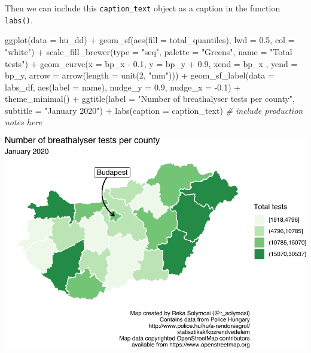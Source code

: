 \documentclass[
]{book}
\newenvironment{Shaded}{\begin{snugshade}}{\end{snugshade}}
\newcommand{\AttributeTok}[1]{\textcolor[rgb]{0.77,0.63,0.00}{#1}}
\newcommand{\CommentTok}[1]{\textcolor[rgb]{0.56,0.35,0.01}{\textit{#1}}}
\newcommand{\DecValTok}[1]{\textcolor[rgb]{0.00,0.00,0.81}{#1}}
\newcommand{\FloatTok}[1]{\textcolor[rgb]{0.00,0.00,0.81}{#1}}
\newcommand{\FunctionTok}[1]{\textcolor[rgb]{0.00,0.00,0.00}{#1}}
\newcommand{\NormalTok}[1]{#1}
\newcommand{\SpecialCharTok}[1]{\textcolor[rgb]{0.00,0.00,0.00}{#1}}
\newcommand{\StringTok}[1]{\textcolor[rgb]{0.31,0.60,0.02}{#1}}
\begin{document}
Then we can include this \texttt{caption\_text} object as a caption in the function \texttt{labs()}.

\begin{Shaded}
\begin{Highlighting}[]
\FunctionTok{ggplot}\NormalTok{(}\AttributeTok{data =}\NormalTok{ hu\_dd) }\SpecialCharTok{+} 
  \FunctionTok{geom\_sf}\NormalTok{(}\FunctionTok{aes}\NormalTok{(}\AttributeTok{fill =}\NormalTok{ total\_quantiles), }
          \AttributeTok{lwd =} \FloatTok{0.5}\NormalTok{, }\AttributeTok{col =} \StringTok{"white"}\NormalTok{) }\SpecialCharTok{+} 
  \FunctionTok{scale\_fill\_brewer}\NormalTok{(}\AttributeTok{type =} \StringTok{"seq"}\NormalTok{, }
                    \AttributeTok{palette =} \StringTok{"Greens"}\NormalTok{, }
                    \AttributeTok{name =} \StringTok{"Total tests"}\NormalTok{) }\SpecialCharTok{+} 
  \FunctionTok{geom\_curve}\NormalTok{(}\AttributeTok{x =}\NormalTok{ bp\_x }\SpecialCharTok{{-}} \FloatTok{0.1}\NormalTok{, }
             \AttributeTok{y =}\NormalTok{ bp\_y }\SpecialCharTok{+} \FloatTok{0.9}\NormalTok{, }
             \AttributeTok{xend =}\NormalTok{ bp\_x , }
             \AttributeTok{yend =}\NormalTok{ bp\_y, }
             \AttributeTok{arrow =} \FunctionTok{arrow}\NormalTok{(}\AttributeTok{length =} \FunctionTok{unit}\NormalTok{(}\DecValTok{2}\NormalTok{, }\StringTok{"mm"}\NormalTok{))) }\SpecialCharTok{+}
  \FunctionTok{geom\_sf\_label}\NormalTok{(}\AttributeTok{data =}\NormalTok{ labs\_df, }
                \FunctionTok{aes}\NormalTok{(}\AttributeTok{label =}\NormalTok{ name), }
                \AttributeTok{nudge\_y =} \FloatTok{0.9}\NormalTok{, }
                \AttributeTok{nudge\_x =} \SpecialCharTok{{-}}\FloatTok{0.1}\NormalTok{) }\SpecialCharTok{+} 
  \FunctionTok{theme\_minimal}\NormalTok{() }\SpecialCharTok{+} 
  \FunctionTok{ggtitle}\NormalTok{(}\AttributeTok{label =} \StringTok{"Number of breathalyser tests per county"}\NormalTok{, }
          \AttributeTok{subtitle =} \StringTok{"January 2020"}\NormalTok{) }\SpecialCharTok{+} 
  \FunctionTok{labs}\NormalTok{(}\AttributeTok{caption =}\NormalTok{ caption\_text) }\CommentTok{\# include production notes here}
\end{Highlighting}
\end{Shaded}

\includegraphics{crime_mapping_files/figure-latex/unnamed-chunk-164-1.pdf}
\end{document}
